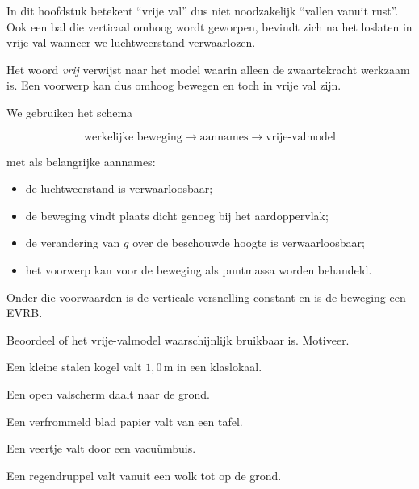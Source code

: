 \documentclass{ximera}
\begin{document}
In dit hoofdstuk betekent ``vrije val'' dus niet noodzakelijk
``vallen vanuit rust''. Ook een bal die verticaal omhoog wordt geworpen,
bevindt zich na het loslaten in vrije val wanneer we luchtweerstand
verwaarlozen.

\begin{opmerking}

Het woord \emph{vrij} verwijst naar het model waarin alleen de
zwaartekracht werkzaam is. Een voorwerp kan dus omhoog bewegen en
toch in vrije val zijn.

\end{opmerking}



We gebruiken het schema

\[
\boxed{
\text{werkelijke beweging}
\longrightarrow
\text{aannames}
\longrightarrow
\text{vrije-valmodel}
}
\]

met als belangrijke aannames:

\begin{itemize}
  \item de luchtweerstand is verwaarloosbaar;
  \item de beweging vindt plaats dicht genoeg bij het aardoppervlak;
  \item de verandering van $g$ over de beschouwde hoogte is verwaarloosbaar;
  \item het voorwerp kan voor de beweging als puntmassa worden behandeld.
\end{itemize}

Onder die voorwaarden is de verticale versnelling constant en is de
beweging een EVRB.


\begin{oefening}{\oefB\ESS}

Beoordeel of het vrije-valmodel waarschijnlijk bruikbaar is. Motiveer.

\begin{question}
Een kleine stalen kogel valt $1,0\,\mathrm{m}$ in een klaslokaal.
\end{question}

\begin{question}
Een open valscherm daalt naar de grond.
\end{question}

\begin{question}
Een verfrommeld blad papier valt van een tafel.
\end{question}

\begin{question}
Een veertje valt door een vacuümbuis.
\end{question}

\begin{question}
Een regendruppel valt vanuit een wolk tot op de grond.
\end{question}

\end{oefening}
\end{document}
